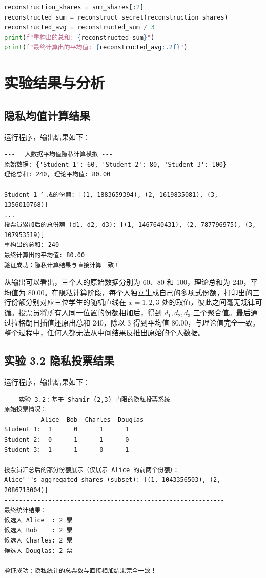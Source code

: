 \documentclass[a4paper]{article}
\begin{document}
\begin{lstlisting}[language=Python,caption={重构与求均值代码片段}]
reconstruction_shares = sum_shares[:2]
reconstructed_sum = reconstruct_secret(reconstruction_shares)
reconstructed_avg = reconstructed_sum / 3
print(f"重构出的总和: {reconstructed_sum}")
print(f"最终计算出的平均值: {reconstructed_avg:.2f}")
\end{lstlisting}

\section{实验结果与分析}
\subsection{隐私均值计算结果}
运行程序，输出结果如下：
\begin{lstlisting}[caption={隐私均值计算实验输出}]
--- 三人数据平均值隐私计算模拟 ---
原始数据: {'Student 1': 60, 'Student 2': 80, 'Student 3': 100}
理论总和: 240, 理论平均值: 80.00
--------------------------------------------------
Student 1 生成的份额: [(1, 1883659394), (2, 1619835081), (3, 1356010768)]
...
投票员累加后的总份额 (d1, d2, d3): [(1, 1467640431), (2, 787796975), (3, 107953519)]
重构出的总和: 240
最终计算出的平均值: 80.00
验证成功：隐私计算结果与直接计算一致！
\end{lstlisting}

从输出可以看出，三个人的原始数据分别为 60、80 和 100，理论总和为 240，平均值为 80.00。在隐私计算阶段，每个人独立生成自己的多项式份额，打印出的三行份额分别对应三位学生的随机直线在 $x=1,2,3$ 处的取值，彼此之间毫无规律可循。投票员将所有人同一位置的份额相加后，得到 $d_1,d_2,d_3$ 三个聚合值。最后通过拉格朗日插值还原出总和 240，除以 3 得到平均值 80.00，与理论值完全一致。整个过程中，任何人都无法从中间结果反推出原始的个人数据。

\subsection{实验 3.2 隐私投票结果}
运行程序，输出结果如下：
\begin{lstlisting}[caption={投票系统实验输出}]
--- 实验 3.2：基于 Shamir (2,3) 门限的隐私投票系统 ---
原始投票情况：
          Alice  Bob  Charles  Douglas
Student 1:  1      0      1      1
Student 2:  0      1      1      0
Student 3:  1      1      0      1
------------------------------------------------------------
投票员汇总后的部分份额展示（仅展示 Alice 的前两个份额）：
Alice"'"s aggregated shares (subset): [(1, 1043356503), (2, 2086713004)]
------------------------------------------------------------
最终统计结果：
候选人 Alice  : 2 票
候选人 Bob    : 2 票
候选人 Charles: 2 票
候选人 Douglas: 2 票
------------------------------------------------------------
验证成功：隐私统计的总票数与直接相加结果完全一致！
\end{lstlisting}
\end{document}
